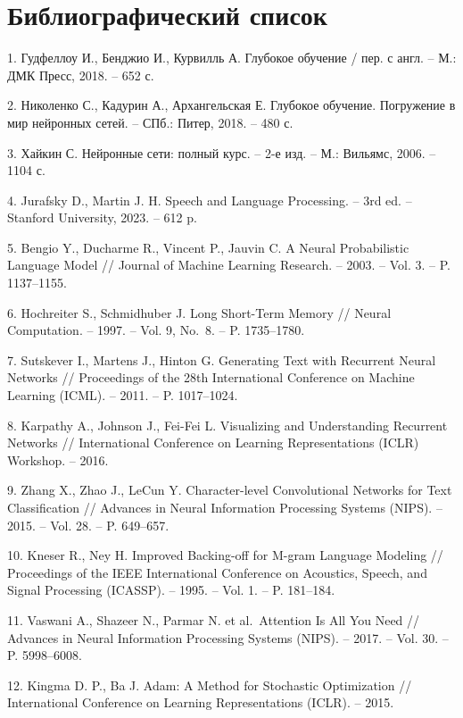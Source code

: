 \chapter*{Библиографический список}\label{ux431ux438ux431ux43bux438ux43eux433ux440ux430ux444ux438ux447ux435ux441ux43aux438ux439-ux441ux43fux438ux441ux43eux43a}

1. Гудфеллоу И., Бенджио И., Курвилль А. Глубокое обучение / пер. с англ. -- М.: ДМК Пресс, 2018. -- 652 с.

2. Николенко С., Кадурин А., Архангельская Е. Глубокое обучение. Погружение в мир нейронных сетей. -- СПб.: Питер, 2018. -- 480 с.

3. Хайкин С. Нейронные сети: полный курс. -- 2-е изд. -- М.: Вильямс, 2006. -- 1104 с.

4. Jurafsky D., Martin J. H. Speech and Language Processing. -- 3rd ed. -- Stanford University, 2023. -- 612 p.

5. Bengio Y., Ducharme R., Vincent P., Jauvin C. A Neural Probabilistic Language Model // Journal of Machine Learning Research. -- 2003. -- Vol. 3. -- P. 1137--1155.

6. Hochreiter S., Schmidhuber J. Long Short-Term Memory // Neural Computation. -- 1997. -- Vol. 9, No.~8. -- P. 1735--1780.

7. Sutskever I., Martens J., Hinton G. Generating Text with Recurrent Neural Networks // Proceedings of the 28th International Conference on Machine Learning (ICML). -- 2011. -- P. 1017--1024.

8. Karpathy A., Johnson J., Fei-Fei L. Visualizing and Understanding Recurrent Networks // International Conference on Learning Representations (ICLR) Workshop. -- 2016.

9. Zhang X., Zhao J., LeCun Y. Character-level Convolutional Networks for Text Classification // Advances in Neural Information Processing Systems (NIPS). -- 2015. -- Vol. 28. -- P. 649--657.

10. Kneser R., Ney H. Improved Backing-off for M-gram Language Modeling // Proceedings of the IEEE International Conference on Acoustics, Speech, and Signal Processing (ICASSP). -- 1995. -- Vol. 1. -- P. 181--184.

11. Vaswani A., Shazeer N., Parmar N. et al.~Attention Is All You Need // Advances in Neural Information Processing Systems (NIPS). -- 2017. -- Vol. 30. -- P. 5998--6008.

12. Kingma D. P., Ba J. Adam: A Method for Stochastic Optimization // International Conference on Learning Representations (ICLR). -- 2015.

